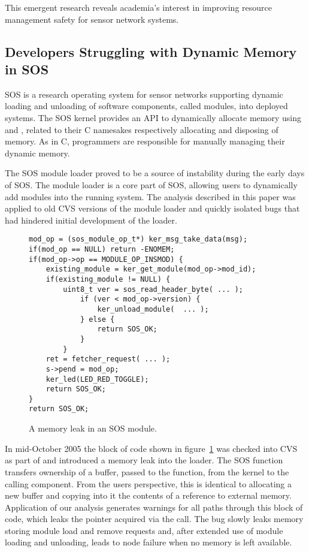 This emergent research reveals academia's interest in improving resource
management safety for sensor network systems.



\subsection{Developers Struggling with Dynamic Memory in SOS}



SOS is a research operating system for sensor networks supporting dynamic
loading and unloading of software components, called modules, into deployed
systems.
%
The SOS kernel provides an API to dynamically allocate memory using
 and , related to their C namesakes
respectively allocating and disposing of memory.  
%
As in C, programmers are responsible for manually managing their dynamic
memory.  



The SOS module loader proved to be a source of instability during the early
days of SOS.
%
The module loader is a core part of SOS, allowing users to dynamically add
modules into the running system.
%
The analysis described in this paper was applied to old CVS versions of the
module loader and quickly isolated bugs that had hindered initial development
of the loader.



\begin{figure}[tp]
\centering
\lstset{numbers=left, language=C}
\begin{lstlisting}
mod_op = (sos_module_op_t*) ker_msg_take_data(msg);
if(mod_op == NULL) return -ENOMEM;
if(mod_op->op == MODULE_OP_INSMOD) {
    existing_module = ker_get_module(mod_op->mod_id);
    if(existing_module != NULL) {
        uint8_t ver = sos_read_header_byte( ... );
            if (ver < mod_op->version) {
                ker_unload_module(  ... );
            } else {
                return SOS_OK;
            }
        }
    ret = fetcher_request( ... );
    s->pend = mod_op;
    ker_led(LED_RED_TOGGLE);
    return SOS_OK;
}
return SOS_OK;
\end{lstlisting}
\caption{\label{fig:leak}A memory leak in an SOS module.}
\end{figure}



In mid-October 2005 the block of code shown in figure~\ref{fig:leak} was
checked into CVS as part of  and introduced a memory leak into
the loader.  
%
The SOS function  transfers ownership of a buffer,
passed to the function, from the kernel to the calling component.
%
From the users perspective, this is identical to allocating a new buffer and
copying into it the contents of a reference to external memory.
%
Application of our analysis generates warnings for all paths through this
block of code, which leaks the  pointer acquired via the
 call.  
%
The bug slowly leaks memory storing module load and remove requests and, after
extended use of module loading and unloading, leads to node failure when no
memory is left available.




